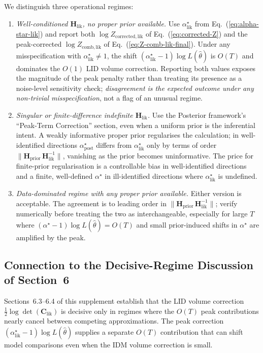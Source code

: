 \documentclass[11pt]{article}
\begin{document}
We distinguish three operational regimes:
\begin{enumerate}
\item[(a)] \emph{Well-conditioned $\mathbf H_{\mathrm{lik}}$, no proper prior available.} Use $\alpha^\star_{\mathrm{lik}}$ from Eq.~(\ref{eq:alpha-star-lik}) and report both $\log Z_{\mathrm{corrected},\mathrm{lik}}$ of Eq.~(\ref{eq:corrected-Z}) and the peak-corrected $\log Z_{\mathrm{comb},\mathrm{lik}}$ of Eq.~(\ref{eq:Z-comb-lik-final}). Under any misspecification with $\alpha^\star_{\mathrm{lik}} \neq 1$, the shift $(\alpha^\star_{\mathrm{lik}}-1)\log L(\hat\theta)$ is $O(T)$ and dominates the $O(1)$ LID volume correction. Reporting both values exposes the magnitude of the peak penalty rather than treating its presence as a noise-level sensitivity check; \emph{disagreement is the expected outcome under any non-trivial misspecification}, not a flag of an unusual regime.
\item[(b)] \emph{Singular or finite-difference indefinite $\mathbf H_{\mathrm{lik}}$.} Use the Posterior framework's ``Peak-Term Correction'' section, even when a uniform prior is the inferential intent. A weakly informative proper prior regularises the calculation; in well-identified directions $\alpha^\star_{\mathrm{post}}$ differs from $\alpha^\star_{\mathrm{lik}}$ only by terms of order $\|\mathbf H_{\mathrm{prior}}\,\mathbf H_{\mathrm{lik}}^{-1}\|$, vanishing as the prior becomes uninformative. The price for finite-prior regularisation is a controllable bias in well-identified directions and a finite, well-defined $\alpha^\star$ in ill-identified directions where $\alpha^\star_{\mathrm{lik}}$ is undefined.
\item[(c)] \emph{Data-dominated regime with any proper prior available.} Either version is acceptable. The agreement is to leading order in $\|\mathbf H_{\mathrm{prior}}\,\mathbf H_{\mathrm{lik}}^{-1}\|$; verify numerically before treating the two as interchangeable, especially for large $T$ where $(\alpha^\star-1)\log L(\hat\theta) = O(T)$ and small prior-induced shifts in $\alpha^\star$ are amplified by the peak.
\end{enumerate}

\subsection{Connection to the Decisive-Regime Discussion of Section~6}
\label{sec:connection-section-6}

Sections~6.3--6.4 of this supplement establish that the LID volume correction $\tfrac{1}{2}\log\det(\mathbf C_{\mathrm{lik}})$ is decisive only in regimes where the $O(T)$ peak contributions nearly cancel between competing approximations. The peak correction $(\alpha^\star_{\mathrm{lik}}-1)\log L(\hat\theta)$ supplies a separate $O(T)$ contribution that can shift model comparisons even when the IDM volume correction is small.
\end{document}
